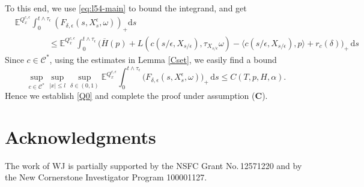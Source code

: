 \documentclass[11pt,reqno]{amsart}
\theoremstyle{definition}
\theoremstyle{remark}
\numberwithin{equation}{section}
\newcommand{\eps}{\epsilon}
\newcommand{\dd}{\mathrm{d}}
\newcommand{\ol}{\overline}
\begin{document}
To this end, we use \eqref{eq:l54-main} to bound the integrand, and get
\begin{equation*}
\begin{aligned}
     &\mathbb{E}^{Q^{c, \epsilon}_{x}} \int^{t\wedge\tau_{\epsilon}}_{0} (F_{\delta,\epsilon}(s,X^{\epsilon}_{s},\omega))_{+}\mathrm{d}s \\
     &\qquad\qquad \le \mathbb{E}^{Q^{c, \epsilon}_{x}} \int^{t\wedge\tau_{\epsilon}}_{0} \Big(\ol{H}(p) + L(c(s/\eps,X_{s/\eps}),\tau_{X_{s/\eps}}\omega) - \langle c(s/\eps,X_{s/\eps}), p\rangle + r_c(\delta)\Big)_+\,\dd s
\end{aligned}
\end{equation*}
Since $c\in \mathscr{C}^*$, using the estimates in Lemma \ref{Cset}, we easily find a bound
\begin{equation*}
    \sup_{c\in \mathscr{C}^*} \sup_{|x| \le l} \sup_{\delta\in (0,1)} \mathbb{E}^{Q^{c, \epsilon}_{x}} \int_0^{t\wedge \tau_\eps} \big(F_{\delta,\eps}(s,X^\eps_s,\omega)\big)_+\,\dd s \le C(T,p,H,\alpha).
\end{equation*}
Hence we establish \eqref{Q0} and complete the proof under assumption ({\bf C}). 


\section*{Acknowledgments}
The work of WJ is partially supported by the NSFC Grant No.\,12571220 and by the New Cornerstone Investigator Program 100001127.





\end{document}
